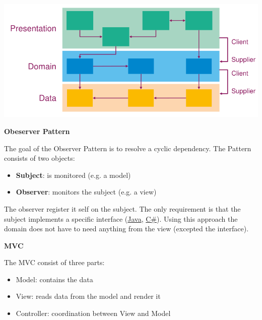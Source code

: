 \documentclass[11pt,twoside,landscape]{article}
\begin{document}
\begin{multicols}{3}
\begin{center}
\includegraphics[width=.9\linewidth]{img/layer_architecture.png}
\end{center}


\textbf{Obeserver Pattern}

The goal of the Observer Pattern is to resolve a cyclic dependency.
The Pattern consists of two objects:
\begin{itemize}
\item \textbf{Subject}: is monitored (e.g. a model)
\item \textbf{Observer}: monitors the subject (e.g. a view)
\end{itemize}


The observer register it self on the subject.
The only requirement is that the subject implements a specific interface (\href{../../../roam/20201116150053-java.org}{Java}, \href{../../../roam/20211003114158-c.org}{C\#}).
Using this approach the domain does not have to need anything from the view (excepted the interface).

\textbf{MVC}

The MVC consist of three parts:
\begin{itemize}
\item Model: contains the data
\item View: reads data from the model and render it
\item Controller: coordination between View and Model
\end{itemize}



\end{multicols}
\end{document}
